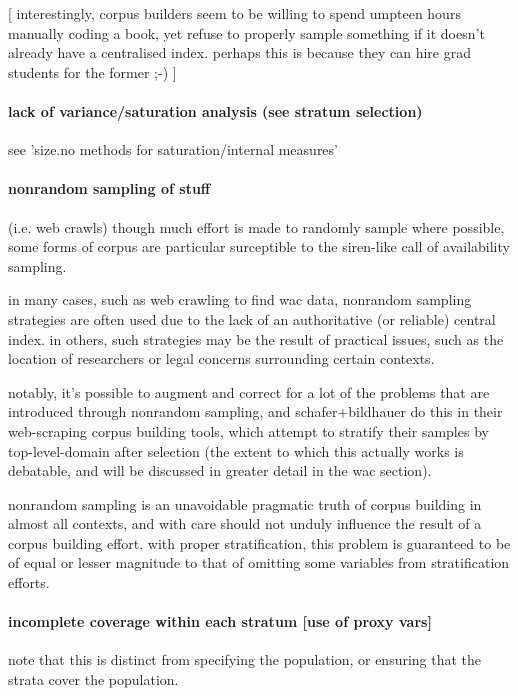 [ interestingly, corpus builders seem to be willing to spend umpteen hours manually coding a book, yet refuse to properly sample something if it doesn't already have a centralised index.  perhaps this is because they can hire grad students for the former ;-) ]


\paragraph{ lack of variance/saturation analysis (see stratum selection)}
see 'size.no methods for saturation/internal measures'


\paragraph{ nonrandom sampling of stuff }
(i.e. web crawls)
though much effort is made to randomly sample where possible, some forms of corpus are particular surceptible to the siren-like call of availability sampling.

in many cases, such as web crawling to find wac data, nonrandom sampling strategies are often used due to the lack of an authoritative (or reliable) central index.  in others, such strategies may be the result of practical issues, such as the location of researchers or legal concerns surrounding certain contexts.

notably, it's possible to augment and correct for a lot of the problems that are introduced through nonrandom sampling, and schafer+bildhauer do this in their web-scraping corpus building tools, which attempt to stratify their samples by top-level-domain after selection (the extent to which this actually works is debatable, and will be discussed in greater detail in the wac section).

nonrandom sampling is an unavoidable pragmatic truth of corpus building in almost all contexts, and with care should not unduly influence the result of a corpus building effort.  with proper stratification, this problem is guaranteed to be of equal or lesser magnitude to that of omitting some variables from stratification efforts.



\paragraph{ incomplete coverage within each stratum [use of proxy vars]}
note that this is distinct from specifying the population, or ensuring that the strata cover the population.

